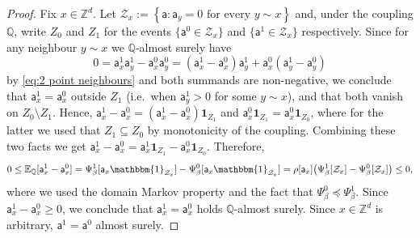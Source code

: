 \documentclass[11pt,a4paper]{article}
\numberwithin{equation}{section}
\theoremstyle{plain}
\theoremstyle{definition}
\begin{document}
\begin{proof}
Fix $x\in \mathbb{Z}^d$. Let $\mathcal Z_x :=
\left\{
\mathsf a :
\mathsf a_y=0\text{ for every }y\sim x
\right\}$ and, under the coupling $\mathbb Q$, write $Z_0$ and $Z_1$ for the events $\{\mathsf a^0\in\mathcal Z_x\}$ and $\{\mathsf a^1\in\mathcal Z_x\}$ respectively. Since for any neighbour $y\sim x$ we $\mathbb{Q}$-almost surely have
\[
0 = \mathsf a^1_x \mathsf a^1_y - \mathsf a^0_x \mathsf a^0_y
=
(\mathsf a_x^1-\mathsf a_x^0)\mathsf a^1_y
+
\mathsf a_x^0(\mathsf a^1_y-\mathsf a^0_y)
\]
by \eqref{eq:2 point neighbours}
and both summands are non-negative, we conclude that $\mathsf a_x^1=\mathsf a_x^0$ outside $Z_1$ (i.e.\ when $\mathsf a_y^1>0$ for some $y\sim x$), and that both vanish on
$Z_0\setminus Z_1$. Hence, $\mathsf a_x^1-\mathsf a_x^0 =
(\mathsf a_x^1-\mathsf a_x^0)\mathbf 1_{Z_1}$ and $\mathsf a_x^0\mathbf 1_{Z_1} = \mathsf a_x^0\mathbf 1_{Z_0}$, where for the latter we used that $Z_1\subseteq Z_0$ by monotonicity of the coupling. Combining these two facts we get
$\mathsf a_x^1-\mathsf a_x^0 =
\mathsf a_x^1\mathbf 1_{Z_1}
-\mathsf a_x^0\mathbf 1_{Z_0}$. Therefore,  
\begin{equation}
0
\leq \mathbb E_{\mathbb Q}[\mathsf a_x^1-\mathsf a_x^0]
=
\Psi_\beta^1[\mathsf a_x \mathbbm{1}_{\mathcal Z_x}]
-
\Psi_\beta^0[\mathsf a_x \mathbbm{1}_{\mathcal Z_x}]
=
\rho[\mathsf a_x]
\bigl(
\Psi_\beta^1[\mathcal Z_x]
-
\Psi_\beta^0[\mathcal Z_x]
\bigr)
\leq0,
\end{equation}
where we used the domain Markov property and the fact that $\Psi_\beta^0\preccurlyeq\Psi_\beta^1$. Since $\mathsf a_x^1-\mathsf a_x^0\geq0$, we conclude that $\mathsf a_x^1=\mathsf a_x^0$ holds $\mathbb{Q}$-almost surely. Since $x\in\mathbb{Z}^d$ is arbitrary, $\mathsf a^1=\mathsf a^0$ almost surely.



\end{proof}
\end{document}
